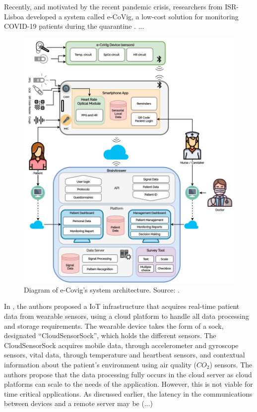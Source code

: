 Recently, and motivated by the recent pandemic crisis, researchers from ISR-Lisboa developed a system called e-CoVig, a low-cost solution for monitoring COVID-19 patients during the quarantine \cite{}. ...

\begin{figure}[H]
    \centering
    \includegraphics[width=0.65\linewidth]{images/ecovig.png}
    \caption[Diagram of e-Covig's system architecture.]{Diagram of e-Covig's system architecture. Source: \cite{}.}
    \label{fig:ecovig-architecture}
\end{figure}

%
%

In \cite{Doukas2012}, the authors proposed a \acs{IoT} infrastructure that acquires real-time patient data from wearable sensors, using a cloud platform to handle all data processing and storage requirements. The wearable device takes the form of a sock, designated ``CloudSensorSock'', which holds the different sensors. The CloudSensorSock acquires mobile data, through accelerometer and gyroscope sensors, vital data, through temperature and heartbeat sensors, and contextual information about the patient's environment using air quality ($CO_2$) sensors. The authors propose that the data processing fully occurs in the cloud server as cloud platforms can scale to the needs of the application. However, this is not viable for time critical applications. As discussed earlier, the latency in the communications between devices and a remote server may be (...)

